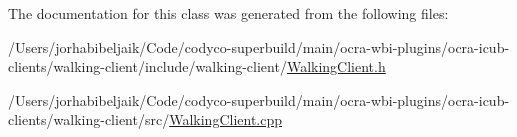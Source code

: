 The documentation for this class was generated from the following files\+:\begin{DoxyCompactItemize}
\item 
/\+Users/jorhabibeljaik/\+Code/codyco-\/superbuild/main/ocra-\/wbi-\/plugins/ocra-\/icub-\/clients/walking-\/client/include/walking-\/client/\hyperlink{WalkingClient_8h}{Walking\+Client.\+h}\item 
/\+Users/jorhabibeljaik/\+Code/codyco-\/superbuild/main/ocra-\/wbi-\/plugins/ocra-\/icub-\/clients/walking-\/client/src/\hyperlink{WalkingClient_8cpp}{Walking\+Client.\+cpp}\end{DoxyCompactItemize}
